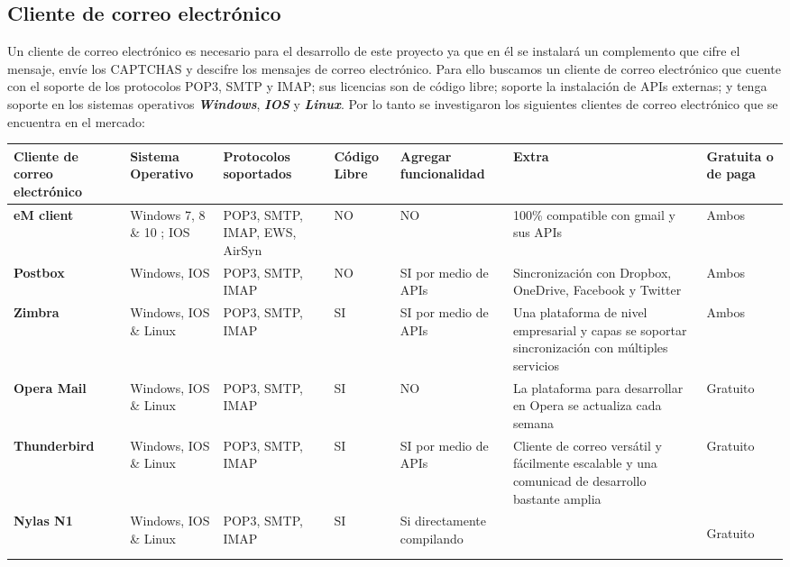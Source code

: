 \subsection{Cliente de correo electrónico}
Un cliente de correo electrónico es necesario para el desarrollo de este proyecto ya que en él se instalará un complemento que cifre el mensaje, envíe los CAPTCHAS y descifre los mensajes de correo electrónico. Para ello buscamos un cliente de correo electrónico que cuente con el soporte de los protocolos POP3, SMTP y IMAP; sus licencias son de código libre; soporte la instalación de APIs externas; y tenga soporte en los sistemas operativos \textbf{\textit{Windows}}, \textbf{\textit{IOS}} y \textbf{\textit{Linux}}. Por lo tanto se investigaron los siguientes clientes de correo electrónico que se encuentra en el mercado: \\
\begin{longtable}[H]{| p{} | p{2cm} |p{2cm}|p{}|p{2cm}|p{3cm}|p{2cm}|}%
 \hline
 \textbf{Cliente de correo electrónico}&\textbf{Sistema Operativo}&\textbf{Protocolos soportados}&\textbf{Código Libre}&\textbf{Agregar funcionalidad}&\textbf{Extra}&\textbf{Gratuita o de paga}\\
 \hline
 \textbf{eM client}&Windows 7, 8 \& 10 ; IOS&POP3, SMTP, IMAP, EWS, AirSyn&NO&NO&100\% compatible con gmail y sus APIs&Ambos\\
 \hline
 \textbf{Postbox}&Windows, IOS&POP3, SMTP, IMAP&NO&SI por medio de APIs&Sincronización con Dropbox, OneDrive, Facebook y Twitter&Ambos\\
 \hline
 \textbf{Zimbra}&Windows, IOS \& Linux&POP3, SMTP, IMAP&SI&SI por medio de APIs&Una plataforma de nivel empresarial y capas se soportar sincronización con múltiples servicios&Ambos\\
 \hline
 \textbf{Opera Mail}&Windows, IOS \& Linux&POP3, SMTP, IMAP&SI&NO&La plataforma para desarrollar en Opera se actualiza cada semana&Gratuito\\
 \hline
 \textbf{Thunderbird}&Windows, IOS \& Linux&POP3, SMTP, IMAP&SI&SI por medio de APIs&Cliente de correo versátil y fácilmente escalable y una comunicad de desarrollo bastante amplia&Gratuito\\
 \hline
 \textbf{Nylas N1}&Windows, IOS \& Linux&POP3, SMTP, IMAP&SI&Si directamente compilando& &Gratuito
 
    \label{tabla:Descripcion de clientes}
    \\
  \hline

\end{longtable}


